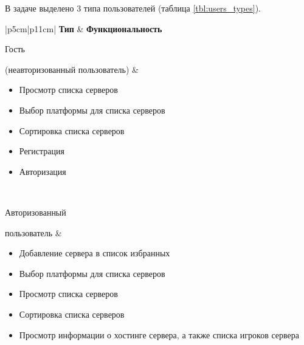 В задаче выделено 3 типа пользователей (таблица \ref{tbl:users_types}). 

\captionsetup{justification=raggedleft,singlelinecheck=off}
\begin{table}[H]
    \centering
	\caption{Типы пользователей}
    \label{tbl:users_types}
	\begin{tabular}{|p{5cm}|p{11cm}|}
        \hline
        \textbf{Тип} & \textbf{Функциональность} \\ \hline

        Гость \par (неавторизованный пользователь) &
            \begin{minipage}[t]{\linewidth}
                \begin{itemize}[nosep,after=\strut]
                    \item Просмотр списка серверов
                    \item Выбор платформы для списка серверов
                    \item Сортировка списка серверов
                    \item Регистрация
                    \item Авторизация
                \end{itemize}
            \end{minipage} 
        \\ \hline

        Авторизованный \par пользователь &
            \begin{minipage}[t]{\linewidth}
                \begin{itemize}[nosep,after=\strut]
                    \item Добавление сервера в список избранных
                    \item Выбор платформы для списка серверов
                    \item Просмотр списка серверов
                    \item Сортировка списка серверов
                    \item Просмотр информации о хостинге сервера, а также списка игроков сервера
                \end{itemize}
            \end{minipage} 
        \\ \hline


\end{tabular}
\end{table}
